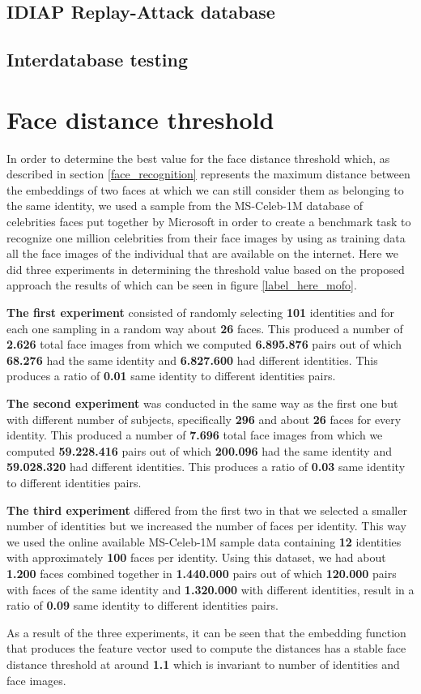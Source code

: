 \subsection{IDIAP Replay-Attack database}
\subsection{Interdatabase testing}
\section{Face distance threshold}
In order to determine the best value for the face distance threshold which, as described in section \ref{face_recognition} represents the maximum distance between the embeddings of two faces at which we can still consider them as belonging to the same identity, we used a sample from the MS-Celeb-1M database of celebrities faces put together by Microsoft in order to create a benchmark task to recognize one million celebrities from their face images by using as training data all the face images of the individual that are available on the internet. Here we did three experiments in determining the threshold value based on the proposed approach the results of which can be seen in figure \ref{label_here_mofo}. 

\textbf{The first experiment} consisted of randomly selecting \textbf{101} identities and for each one sampling in a random way about \textbf{26} faces. This produced a number of \textbf{2.626} total face images from which we computed \textbf{6.895.876} pairs out of which \textbf{68.276} had the same identity and \textbf{6.827.600} had different identities. This produces a ratio of \textbf{0.01} same identity to different identities pairs.

\textbf{The second experiment} was conducted in the same way as the first one but with different number of subjects, specifically \textbf{296} and about \textbf{26} faces for every identity. This produced a number of \textbf{7.696} total face images from which we computed \textbf{59.228.416} pairs out of which \textbf{200.096} had the same identity and \textbf{59.028.320} had different identities. This produces a ratio of \textbf{0.03} same identity to different identities pairs.

\textbf{The third experiment} differed from the first two in that we selected a smaller number of identities but we increased the number of faces per identity. This way we used the online available MS-Celeb-1M sample data containing \textbf{12} identities with approximately \textbf{100} faces per identity. Using this dataset, we had about \textbf{1.200} faces combined together in \textbf{1.440.000} pairs out of which \textbf{120.000} pairs with faces of the same identity and \textbf{1.320.000} with different identities, result in a ratio of \textbf{0.09} same identity to different identities pairs.

As a result of the three experiments, it can be seen that the embedding function that produces the feature vector used to compute the distances has a stable face distance threshold at around \textbf{1.1} which is invariant to number of identities and face images.